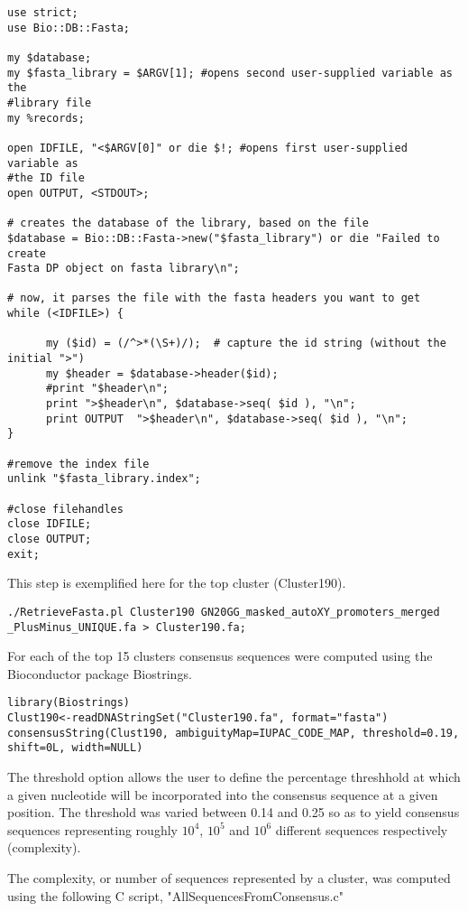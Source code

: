 \begin{footnotesize}
\begin{lstlisting}
use strict;
use Bio::DB::Fasta;

my $database;
my $fasta_library = $ARGV[1]; #opens second user-supplied variable as the 
#library file
my %records;

open IDFILE, "<$ARGV[0]" or die $!; #opens first user-supplied variable as 
#the ID file
open OUTPUT, <STDOUT>;

# creates the database of the library, based on the file
$database = Bio::DB::Fasta->new("$fasta_library") or die "Failed to create 
Fasta DP object on fasta library\n";

# now, it parses the file with the fasta headers you want to get
while (<IDFILE>) {

      my ($id) = (/^>*(\S+)/);  # capture the id string (without the initial ">")
      my $header = $database->header($id);
      #print "$header\n";
      print ">$header\n", $database->seq( $id ), "\n";
      print OUTPUT  ">$header\n", $database->seq( $id ), "\n";
}

#remove the index file 
unlink "$fasta_library.index";

#close filehandles
close IDFILE;
close OUTPUT;
exit;
\end{lstlisting}

This step is exemplified here  for the top cluster (Cluster190).

\begin{lstlisting}
./RetrieveFasta.pl Cluster190 GN20GG_masked_autoXY_promoters_merged
_PlusMinus_UNIQUE.fa > Cluster190.fa;
\end{lstlisting}

For each of the top 15 clusters consensus sequences were computed using the Bioconductor package Biostrings.

\begin{lstlisting}
library(Biostrings)
Clust190<-readDNAStringSet("Cluster190.fa", format="fasta") 
consensusString(Clust190, ambiguityMap=IUPAC_CODE_MAP, threshold=0.19,
shift=0L, width=NULL) 
\end{lstlisting}

The threshold option allows the user to define the percentage threshhold at which a given nucleotide will be incorporated into the consensus sequence at a given position. The threshold was varied between 0.14 and 0.25 so as to yield consensus sequences representing roughly $10^4$, $10^5$ and $10^6$ different sequences respectively (complexity).

The complexity, or number of sequences represented by a cluster, was computed using the following C script\cite{Lindenbaum:Online}, "AllSequencesFromConsensus.c"


\end{footnotesize}
